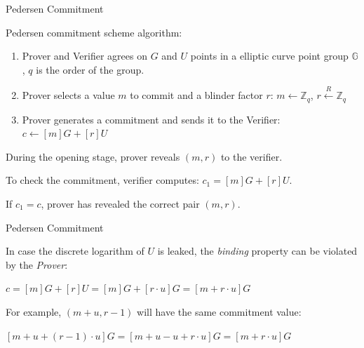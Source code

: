 \documentclass[xcolor={usenames,dvipsnames}]{beamer}
\begin{document}
    \begin{frame}{Pedersen Commitment}

        \begin{definition}
            Pedersen commitment scheme algorithm:
            \begin{enumerate}
                \item Prover and Verifier agrees on $G$ and $U$ points in a elliptic curve point group $\mathbb{G}$, $q$ is the order of the group.
                \item Prover selects a value $m$ to commit and a blinder factor $r$:
                        $m \leftarrow \mathbb{Z}_q$,
                        $r \xleftarrow{R} \mathbb{Z}_q$
                \item Prover generates a commitment and sends it to the Verifier:
                        $c \gets [m]G + [r]U$
            \end{enumerate}
        \end{definition}

        During the opening stage, prover reveals $(m, r)$ to the verifier. 
        
        To check the commitment, verifier computes: $c_1 = [m]G + [r]U$. 
        
        If $c_1 = c$, prover has revealed the correct pair $(m, r)$.

    \end{frame}

    \begin{frame}{Pedersen Commitment}

            In case the discrete logarithm of $U$ is leaked, the \textit{binding} property can be violated by the \textit{Prover}:
        
            \begin{center}
                $c = [m]G + [r]U = [m] G + [r \cdot u]G = [m + r \cdot u] G$
            \end{center}
        
            For example, $(m + u, r - 1)$ will have the same commitment value:
        
            \begin{center}
                $[m+u + (r-1) \cdot u] G = [m + u - u + r \cdot u] G = [m + r \cdot u] G$     
            \end{center}
            
    \end{frame}
\end{document}
